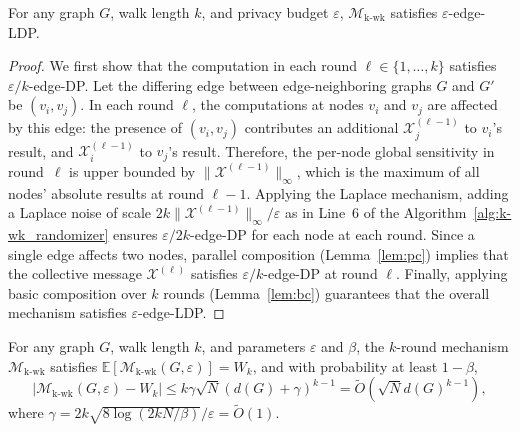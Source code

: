 


\begin{theorem}
For any graph $G$, walk length $k$, and privacy budget $\varepsilon$, $\mathcal{M}_{\mathrm{k\text{-}wk}}$ satisfies $\varepsilon$-edge-LDP.
\end{theorem}


\begin{proof}
We first show that the computation in each round $\ell \in \{1, \dots, k\}$ satisfies $\varepsilon/k$-edge-DP.
Let the differing edge between edge-neighboring graphs $G$ and $G'$ be $(v_i, v_j)$. 
In each round $\ell$, the computations at nodes $v_i$ and $v_j$ are affected by this edge: the presence of $(v_i, v_j)$ contributes an additional $\mathcal{X}^{(\ell-1)}_j$ to $v_i$'s result, and $\mathcal{X}^{(\ell-1)}_i$ to $v_j$'s result. 
Therefore, the per-node global sensitivity in round~$\ell$ is upper bounded by 
$\|\mathcal{X}^{(\ell-1)}\|_\infty$, which is the maximum of all nodes' absolute results at round $\ell{-}1$.
Applying the Laplace mechanism, adding a Laplace noise of scale $2k\|\mathcal{X}^{(\ell-1)}\|_\infty/\varepsilon$ as in Line~6 of the Algorithm~\ref{alg:k-wk_randomizer} ensures $\varepsilon/2k$-edge-DP for each node at each round. 
Since a single edge affects two nodes, parallel composition (Lemma~\ref{lem:pc}) implies that the collective message $\mathcal{X}^{(\ell)}$ satisfies $\varepsilon/k$-edge-DP at round $\ell$. 
Finally, applying basic composition over $k$ rounds (Lemma~\ref{lem:bc}) guarantees that the overall mechanism satisfies $\varepsilon$-edge-LDP.
\end{proof}




\begin{theorem}
For any graph $G$, walk length $k$, and parameters $\varepsilon$ and $\beta$, the $k$-round mechanism $\mathcal{M}_{\mathrm{k\text{-}wk}}$ satisfies
$\mathbb{E}[\mathcal{M}_{\mathrm{k\text{-}wk}}(G,\varepsilon)] = {W}_k$,
and with probability at least $1 - \beta$,
\begin{equation*}
|\mathcal{M}_{\mathrm{k\text{-}wk}}(G,\varepsilon) - {W}_k|
  \leq  k\gamma \sqrt{N} (d(G) + \gamma)^{k-1} = \tilde{O}(\sqrt{N}d(G)^{k-1}),
\end{equation*}
where $\gamma = 2k\sqrt{8\log(2kN/\beta)}/\varepsilon = \tilde{O}(1)$.  
\end{theorem}



